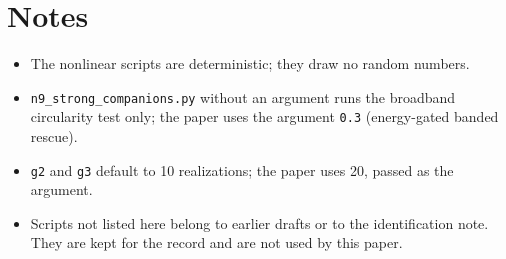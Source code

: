 \documentclass[10pt]{article}
\newcommand{\f}[1]{\texttt{#1}}
\begin{document}
\section{Notes}
\begin{itemize}
\item The nonlinear scripts are deterministic; they draw no random numbers.
\item \f{n9\_\allowbreak{}strong\_\allowbreak{}companions.py} without an argument runs the broadband circularity test only; the paper uses the argument \f{0.3} (energy-gated banded rescue).
\item \f{g2} and \f{g3} default to 10 realizations; the paper uses 20, passed as the argument.
\item Scripts not listed here belong to earlier drafts or to the identification note. They are kept for the record and are not used by this paper.
\end{itemize}
\end{document}
